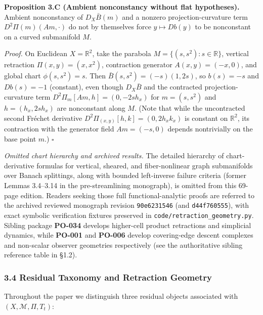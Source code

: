 \documentclass[
  11pt,
]{article}
\begin{document}
\textbf{Proposition 3.C (Ambient nonconstancy without flat hypotheses).} Ambient nonconstancy of \(D_X\bar B(m)\) and a nonzero projection-curvature term \(D^2\Pi(m)(Am,\cdot)\) do not by themselves force \(y\mapsto Db(y)\) to be nonconstant on a curved submanifold \(M\).

\emph{Proof.} On Euclidean \(X=\mathbb R^2\), take the parabola \(M=\{(s,s^2):s\in\mathbb R\}\), vertical retraction \(\Pi(x,y)=(x,x^2)\), contraction generator \(A(x,y)=(-x,0)\), and global chart \(\phi(s,s^2)=s\). Then \(\bar B(s,s^2)=(-s)(1,2s)\), so \(b(s)=-s\) and \(Db(s)=-1\) (constant), even though \(D_X\bar B\) and the contracted projection-curvature term \(D^2\Pi_m[Am, h] = (0, -2s h_x)\) for \(m=(s,s^2)\) and \(h=(h_x, 2s h_x)\) are nonconstant along \(M\). (Note that while the uncontracted second Fréchet derivative \(D^2\Pi_{(x,y)}[h,k] = (0, 2h_x k_x)\) is constant on \(\mathbb R^2\), its contraction with the generator field \(Am=(-s,0)\) depends nontrivially on the base point \(m\).) \(\square\)

\emph{Omitted chart hierarchy and archived results.} The detailed hierarchy of chart-derivative formulas for vertical, sheared, and fiber-nonlinear graph submanifolds over Banach splittings, along with bounded left-inverse failure criteria (former Lemmas 3.4--3.14 in the pre-streamlining monograph), is omitted from this 69-page edition. Readers seeking those full functional-analytic proofs are referred to the archived reviewed monograph revision \texttt{90e6231546} (and \texttt{d44f760555}), with exact symbolic verification fixtures preserved in \texttt{code/retraction\_geometry.py}. Sibling package \textbf{PO-034} develops higher-cell product retractions and simplicial dynamics, while \textbf{PO-001} and \textbf{PO-006} develop covering-edge descent complexes and non-scalar observer geometries respectively (see the authoritative sibling reference table in §1.2).

\subsubsection{3.4 Residual Taxonomy and Retraction Geometry}\label{residual-taxonomy-and-retraction-geometry}

Throughout the paper we distinguish three residual objects associated with \((X, \mathcal{M}, \Pi, T_t)\):
\end{document}
